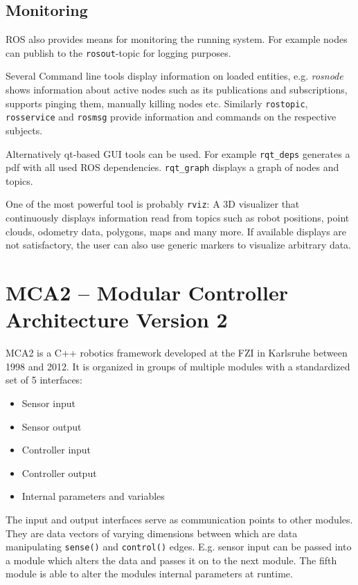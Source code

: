 \subsection{Monitoring}
ROS also provides means for monitoring the running system. For example nodes can publish to the \texttt{rosout}-topic for logging purposes.

Several Command line tools display information on loaded entities, e.g. \textit{rosnode} shows information about active nodes such as its publications and subscriptions, supports pinging them, manually killing nodes etc. Similarly \texttt{rostopic}, \texttt{rosservice} and \texttt{rosmsg} provide information and commands on the respective subjects.

Alternatively qt-based GUI tools can be used. For example \texttt{rqt\_deps} generates a pdf with all used ROS dependencies. \texttt{rqt\_graph} displays a graph of nodes and topics.

One of the most powerful tool is probably \texttt{rviz}: A 3D visualizer that continuously displays information read from topics such as robot positions, point clouds, odometry data, polygons, maps and many more. If available displays are not satisfactory, the user can also use generic markers to visualize arbitrary data.

\section{MCA2 -- Modular Controller Architecture Version 2}
MCA2 is a C++ robotics framework developed at the FZI in Karlsruhe between 1998 and 2012. It is organized in groups of multiple modules with a standardized set of 5 interfaces: 
\begin{itemize}
\item Sensor input
\item Sensor output
\item Controller input
\item Controller output
\item Internal parameters and variables
\end{itemize}

The input and output interfaces serve as communication points to other modules. They are data vectors of varying dimensions between which are data manipulating \texttt{sense()} and \texttt{control()} edges. E.g. sensor input can be passed into a module which alters the data and passes it on to the next module. The fifth module is able to alter the modules internal parameters at runtime.

